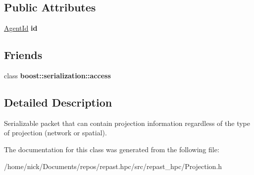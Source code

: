 \subsection*{Public Attributes}
\begin{DoxyCompactItemize}
\item 
\hypertarget{classrepast_1_1_projection_info_packet_ae68c1d9e0a767a560546729f59a22307}{\hyperlink{classrepast_1_1_agent_id}{Agent\-Id} {\bfseries id}}\label{classrepast_1_1_projection_info_packet_ae68c1d9e0a767a560546729f59a22307}

\end{DoxyCompactItemize}
\subsection*{Friends}
\begin{DoxyCompactItemize}
\item 
\hypertarget{classrepast_1_1_projection_info_packet_ac98d07dd8f7b70e16ccb9a01abf56b9c}{class {\bfseries boost\-::serialization\-::access}}\label{classrepast_1_1_projection_info_packet_ac98d07dd8f7b70e16ccb9a01abf56b9c}

\end{DoxyCompactItemize}


\subsection{Detailed Description}
Serializable packet that can contain projection information regardless of the type of projection (network or spatial). 

The documentation for this class was generated from the following file\-:\begin{DoxyCompactItemize}
\item 
/home/nick/\-Documents/repos/repast.\-hpc/src/repast\-\_\-hpc/Projection.\-h\end{DoxyCompactItemize}
